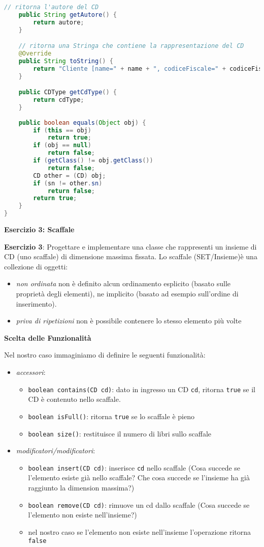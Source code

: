 \documentclass{article}
\begin{document}
\begin{lstlisting}[language=Java,escapechar=|]
	// ritorna l'autore del CD
	public String getAutore() {
		return autore;
	}

	// ritorna una Stringa che contiene la rappresentazione del CD 
	@Override
	public String toString() {
		return "Cliente [name=" + name + ", codiceFiscale=" + codiceFiscale+ "]";
	}

	public CDType getCdType() {
		return cdType;
	}
	
	public boolean equals(Object obj) {
		if (this == obj)
			return true;
		if (obj == null)
			return false;
		if (getClass() != obj.getClass())
			return false;
		CD other = (CD) obj;
		if (sn != other.sn)
			return false;
		return true;
	}
}

\end{lstlisting}

\textbf{Esercizio 3: Scaffale}
\begin{framed}
\textbf{Esercizio 3}: Progettare e implementare una classe che rappresenti un insieme di CD (uno scaffale) di dimensione massima fissata. Lo scaffale (SET/Insieme)\`e una collezione di oggetti:
\begin{itemize}
	\item \emph{non ordinata} non è definito alcun ordinamento esplicito (basato sulle proprietà degli elementi),
	ne implicito (basato ad esempio sull'ordine di inserimento).
	\item \emph{priva di ripetizioni} non è possibile contenere lo stesso elemento più volte
\end{itemize}
\end{framed}

\textbf{Scelta delle Funzionalit\`a}

Nel nostro caso immaginiamo di definire le seguenti funzionalit\`a:
\begin{itemize}
\item \emph{accessori}:
\begin{itemize}
\item \texttt{boolean contains(CD cd)}: dato in ingresso un CD \texttt{cd}, ritorna \texttt{true} se il CD è contenuto nello scaffale.
\item \texttt{boolean isFull()}: ritorna \texttt{true} se lo scaffale \`e pieno
\item \texttt{boolean size()}: restituisce il numero di libri sullo scaffale
\end{itemize}
\item \emph{modificatori/modificatori}:
\begin{itemize}
\item  \texttt{boolean insert(CD cd)}: inserisce \texttt{cd} nello scaffale (Cosa succede se l'elemento esiste gi\`a nello scaffale? Che cosa succede se l'insieme ha gi\`a raggiunto la dimension massima?)
\item \texttt{boolean remove(CD cd)}: rimuove un cd dallo scaffale (Cosa succede se l'elemento non esiste  nell'insieme?)
\item nel nostro caso se l'elemento non esiste nell'insieme l'operazione ritorna \texttt{false}
\end{itemize}
\end{itemize}
\end{document}

